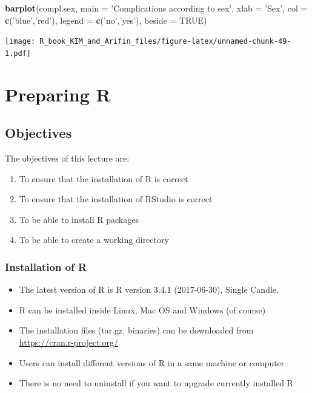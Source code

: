 \documentclass[]{book}
\newenvironment{Shaded}{\begin{snugshade}}{\end{snugshade}}
\newcommand{\KeywordTok}[1]{\textcolor[rgb]{0.13,0.29,0.53}{\textbf{#1}}}
\newcommand{\DataTypeTok}[1]{\textcolor[rgb]{0.13,0.29,0.53}{#1}}
\newcommand{\StringTok}[1]{\textcolor[rgb]{0.31,0.60,0.02}{#1}}
\newcommand{\OtherTok}[1]{\textcolor[rgb]{0.56,0.35,0.01}{#1}}
\newcommand{\NormalTok}[1]{#1}
\providecommand{\tightlist}{%
  \setlength{\itemsep}{0pt}\setlength{\parskip}{0pt}}
\theoremstyle{definition}
\theoremstyle{definition}
\theoremstyle{remark}
\begin{document}
\begin{Shaded}
\begin{Highlighting}[]
\KeywordTok{barplot}\NormalTok{(compl.sex,}
        \DataTypeTok{main =} \StringTok{'Complications according to sex'}\NormalTok{,}
        \DataTypeTok{xlab =} \StringTok{'Sex'}\NormalTok{,}
        \DataTypeTok{col =} \KeywordTok{c}\NormalTok{(}\StringTok{'blue'}\NormalTok{,}\StringTok{'red'}\NormalTok{),}
        \DataTypeTok{legend =} \KeywordTok{c}\NormalTok{(}\StringTok{'no'}\NormalTok{,}\StringTok{'yes'}\NormalTok{),}
        \DataTypeTok{beside =} \OtherTok{TRUE}\NormalTok{)}
\end{Highlighting}
\end{Shaded}

\texttt{[image: R\_book\_KIM\_and\_Arifin\_files/figure-latex/unnamed-chunk-49-1.pdf]}

\chapter{Preparing R}\label{preparing-r}

\section{Objectives}\label{objectives}

The objectives of this lecture are:

\begin{enumerate}
\def\labelenumi{\arabic{enumi}.}
\tightlist
\item
  To ensure that the installation of R is correct
\item
  To ensure that the installation of RStudio is correct
\item
  To be able to install R packages
\item
  To be able to create a working directory
\end{enumerate}

\subsection{Installation of R}\label{installation-of-r}

\begin{itemize}
\tightlist
\item
  The latest version of R is R version 3.4.1 (2017-06-30), Single
  Candle.
\item
  R can be installed inside Linux, Mac OS and Windows (of course)
\item
  The installation files (tar.gz, binaries) can be downloaded from
  \url{https://cran.r-project.org/}
\item
  Users can install different versions of R in a same machine or
  computer
\item
  There is no need to uninstall if you want to upgrade currently
  installed R
\end{itemize}
\end{document}
